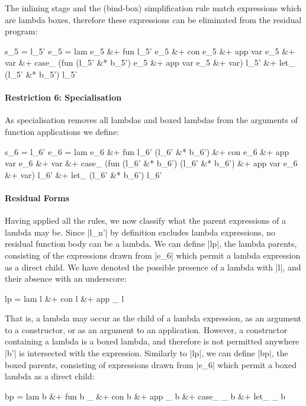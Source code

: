 \documentclass[preprint]{sigplanconf}
\begin{document}
The inlining stage and the (bind-box) simplification rule match expressions which are lambda boxes, therefore these expressions can be eliminated from the residual program:

\ignore\begin{code}
s_5   =  l_5'
e_5   =  lam e_5 &+ fun l_5' e_5 &+ con e_5 &+ app var e_5 &+ var &+
         case_ (fun (l_5' &* b_5') e_5 &+ app var e_5 &+ var) l_5' &+
         let_ (l_5' &* b_5') l_5'
\end{code}

\paragraph{Restriction 6: Specialisation}
As specialisation removes all lambdas and boxed lambdas from the arguments of function applications we define:

\ignore\begin{code}
s_6  =  l_6'
e_6  =  lam e_6 &+ fun l_6' (l_6' &* b_6') &+ con e_6 &+ app var e_6 &+ var &+
        case_ (fun (l_6' &* b_6') (l_6' &* b_6') &+ app var e_6 &+ var) l_6' &+
        let_ (l_6' &* b_6') l_6'
\end{code}

\paragraph{Residual Forms}
Having applied all the rules, we now classify what the parent expressions of a lambda may be. Since |l_n'| by definition excludes lambda expressions, no residual function body can be a lambda. We can define |lp|, the lambda parents, consisting of the expressions drawn from |e_6| which permit a lambda expression as a direct child. We have denoted the possible presence of a lambda with |l|, and their absence with an underscore:

\ignore\begin{code}
lp = lam l &+ con l &+ app _ l
\end{code}

That is, a lambda may occur as the child of a lambda expression, as an argument to a constructor, or as an argument to an application. However, a constructor containing a lambda is a boxed lambda, and therefore is not permitted anywhere |b'| is intersected with the expression. Similarly to |lp|, we can define |bp|, the boxed parents, consisting of expressions drawn from |e_6| which permit a boxed lambda as a direct child:

\ignore\begin{code}
bp = lam b &+ fun b _ &+ con b &+ app _ b &+ case_ _ b &+ let_ _ b
\end{code}
\end{document}
